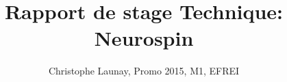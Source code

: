 \documentclass[]{report}
\title{Rapport de stage Technique:
	Neurospin}
\author{Christophe Launay, Promo 2015, M1, EFREI}
\begin{document}
	
\maketitle

\listoftodos

\tableofcontents







\end{document}

